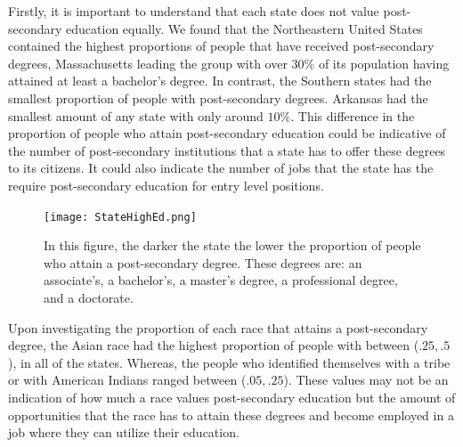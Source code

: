 \documentclass{article}
\begin{document}
Firstly, it is important to understand that each state does not value post-secondary education equally. We found that
the Northeastern United States contained the highest proportions of people that have received post-secondary
degrees, Massachusetts leading the group with over $30\%$ of its population having attained at least a bachelor's
degree. In contrast, the Southern states had the smallest proportion of people with post-secondary degrees. Arkansas had
the smallest amount of any state with only around $10\%$. This difference in the proportion of people who attain post-secondary
education could be indicative of the number of post-secondary institutions that a state has to offer these degrees to its
citizens. It could also indicate the number of jobs that the state has the require post-secondary education for entry level
positions. 

\begin{figure}
\texttt{[image: StateHighEd.png]}
\caption{In this figure, the darker the state the lower the proportion of people who attain a post-secondary degree. 
These degrees are: an associate's, a bachelor's, a master's degree, a professional degree, and a doctorate.}
\end{figure}

Upon investigating the proportion of each race that attains a post-secondary degree, the Asian race had the highest
proportion of people with between ($.25, .5$), in all of the states. Whereas, the people who identified themselves with
a tribe or with American Indians ranged between ($.05, .25$). These values may not be an indication of how much
a race values post-secondary education but the amount of opportunities that the race has to attain these degrees 
and become employed in a job where they can utilize their education. 
\end{document}
